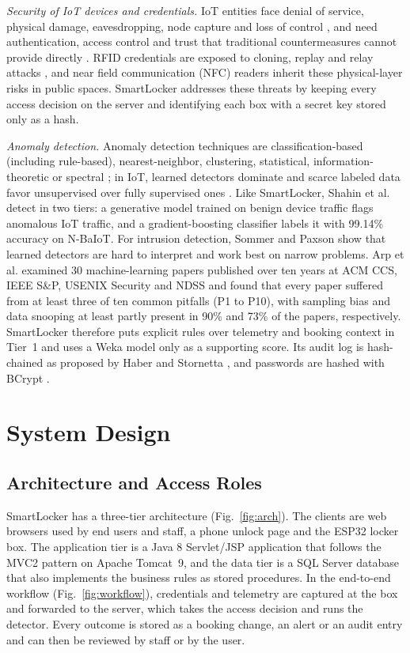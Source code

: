\documentclass[journal,onecolumn]{IEEEtran}
\begin{document}
\textit{Security of IoT devices and credentials.} IoT entities face denial of service, physical damage, eavesdropping,
node capture and loss of control \cite{roman2013features}, and need authentication, access control and trust that
traditional countermeasures cannot provide directly \cite{sicari2015security}. RFID credentials are exposed to cloning, replay and relay
attacks \cite{mitrokotsa2010rfid}, and near field communication (NFC) readers inherit these physical-layer risks in
public spaces. SmartLocker addresses these threats by keeping every
access decision on the server and identifying each box with a secret key stored only as a hash.

\textit{Anomaly detection.} Anomaly detection techniques are classification-based (including rule-based), nearest-neighbor,
clustering, statistical, information-theoretic or spectral \cite{chandola2009anomaly}; in IoT, learned detectors
dominate and scarce labeled data favor unsupervised over fully supervised ones \cite{demedeiros2023anomaly}. Like SmartLocker, Shahin et al. \cite{shahin2025twostage} detect in two
tiers: a generative model trained on benign device traffic flags anomalous IoT traffic, and a gradient-boosting
classifier labels it with 99.14\% accuracy on N-BaIoT. For intrusion detection, Sommer and Paxson
\cite{sommer2010outside} show that learned detectors are hard to interpret and work best on narrow problems. Arp et
al. \cite{arp2022dos} examined 30 machine-learning papers published over ten years at ACM CCS, IEEE S\&P, USENIX
Security and NDSS and found that every paper suffered from at least three of ten common pitfalls (P1 to P10), with sampling bias
and data snooping at least partly present in 90\% and 73\% of the papers, respectively. SmartLocker therefore puts
explicit rules over telemetry and booking context in Tier~1 and uses a Weka model \cite{hall2009weka} only as a
supporting score. Its audit log is hash-chained as proposed by Haber and Stornetta \cite{haber1991timestamp}, and
passwords are hashed with BCrypt \cite{provos1999bcrypt}.

\section{System Design}

\subsection{Architecture and Access Roles}

SmartLocker has a three-tier architecture (Fig.~\ref{fig:arch}). The clients are web browsers used by end users and
staff, a phone unlock page and the ESP32 locker box. The application tier is a Java 8 Servlet/JSP application that
follows the MVC2 pattern on Apache Tomcat~9, and the data tier is a SQL Server database that also implements the
business rules as stored procedures. In the end-to-end workflow (Fig.~\ref{fig:workflow}), credentials and telemetry
are captured at the box and forwarded to the server, which takes the access decision and runs the detector. Every
outcome is stored as a booking change, an alert or an audit entry and can then be reviewed by staff or by the user.
\end{document}
